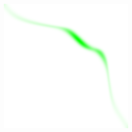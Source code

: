 \documentclass[cn,10pt,math=newtx,citestyle=gb7714-2015,bibstyle=gb7714-2015]{elegantbook}
\begin{document}
\begin{figure}[H]
\begin{minipage}{0.20\linewidth}
\begin{mdframed}
		\end{mdframed}
	\end{minipage}
	\begin{minipage}{0.20\linewidth}
		\centering
		\begin{mdframed}
		    \includegraphics[width=\linewidth]{figure/fig4.2/evol-img-50.png}
		\end{mdframed}
	\end{minipage}
	\vspace{1em}
	

\end{figure}
\end{document}

